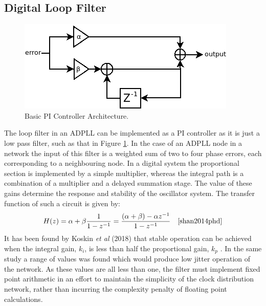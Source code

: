 \documentclass[11pt,english,british]{report}
\begin{document}
\subsection{Digital Loop Filter}
\begin{figure}[h]
	\centering
	\includegraphics[scale=0.45]{../pi_simple} %
	\caption{Basic PI Controller Architecture.}
	\label{fig:my_simple_pi}
\end{figure}
The loop filter in an ADPLL can be implemented as a PI controller as it is just a low pass filter, such as that in Figure \ref{fig:my_simple_pi}. In the case of an ADPLL node in a network the input of this filter is a weighted sum of two to four phase errors, each corresponding to a neighbouring node. In a digital system the proportional section is implemented by a simple multiplier, whereas the integral path is a combination of a multiplier and a delayed summation stage. The value of these gains determine the response and stability of the oscillator system. The transfer function of such a circuit is given by:
\begin{equation*}
	H(z) = \alpha + \beta\frac{1}{1-z^{-1}} = \frac{(\alpha + \beta) - \alpha z^{-1}}{1-z^{-1}}~~~\cite{shan2014phd}
\end{equation*}
It has been found by Koskin \textit{et al} (2018) that stable operation can be achieved when the integral gain, $k_i$, is less than half the proportional gain, $k_p$ \cite{koskin2018generation}. In the same study a range of values was found which would produce low jitter operation of the network. As these values are all less than one, the filter must implement fixed point arithmetic in an effort to maintain the simplicity of the clock distribution network, rather than incurring the complexity penalty of floating point calculations.
\end{document}
